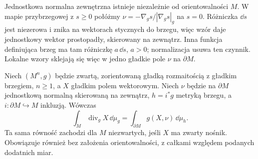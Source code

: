 Jednostkowa normalna zewnętrzna istnieje niezależnie
od orientowalności $M$. W mapie przybrzegowej z
$s\geq0$ połóżmy
$\nu=-\nabla_g s/|\nabla_g s|_g$ na $s=0$.
Różniczka $\dd s$ jest niezerowa i znika na wektorach
stycznych do brzegu, więc wzór daje jednostkowy wektor
prostopadły, skierowany na zewnątrz. Inna funkcja
definiująca brzeg ma tam różniczkę $a\,\dd s$, $a>0$;
normalizacja usuwa ten czynnik. Lokalne wzory sklejają
się więc w jedno gładkie pole $\nu$ na $\partial M$.

\begin{twierdzenie}
\label{thm:gauss-riemannowski}
Niech $(M^n,g)$ będzie zwartą, zorientowaną
gładką rozmaitością z gładkim brzegiem,
$n\geq1$, a $X$ gładkim polem wektorowym.
Niech $\nu$ będzie na $\partial M$
jednostkową normalną skierowaną na zewnątrz,
$h=i^*g$ metryką brzegu, a
$i:\partial M\hookrightarrow M$ inkluzją.
Wówczas
\begin{equation}\label{eq:gauss-riemannowski}
 \boxed{\displaystyle
 \int_M\operatorname{div}_gX\,\dd\mu_g
 =\int_{\partial M}g(X,\nu)\,\dd\mu_h.}
\end{equation}
Ta sama równość zachodzi dla $M$ niezwartych,
jeśli $X$ ma zwarty nośnik. Obowiązuje również
bez założenia orientowalności, z całkami względem
podanych dodatnich miar.
\end{twierdzenie}
